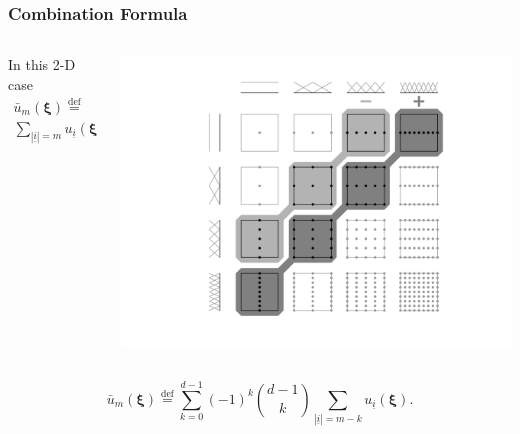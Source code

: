 \documentclass[11pt,ucs]{beamer}
\begin{document}
\begin{frame}\frametitle{Combination Formula}




\begin{columns}
\begin{column}{0.4\textwidth}
In this 2-D case
\begin{gather*}
\bar u_{m}(\boldsymbol{\xi})  \overset{\text{def}}{=}  \\
\sum_{|\underline{i}|=m}u_{\underline{i}}(\boldsymbol{\xi})  
 - \sum_{|\underline{i}|=m-1}u_{\underline{i}}(\boldsymbol{\xi}) .
\end{gather*}
\end{column}

\begin{column}{0.6\textwidth}

\centering
\includegraphics[width=1.1\textwidth]{combination_linear.png}


\end{column}

\end{columns}

\pause
\begin{equation*}
\bar u_{m}(\boldsymbol{\xi})  \overset{\text{def}}{=}  \sum_{k=0}^{d-1}(-1)^{k}\binom{d-1}{k}\sum_{|\underline{i}|=m-k}u_{\underline{i}}(\boldsymbol{\xi}) .
\end{equation*}

%

\end{frame}
\end{document}
